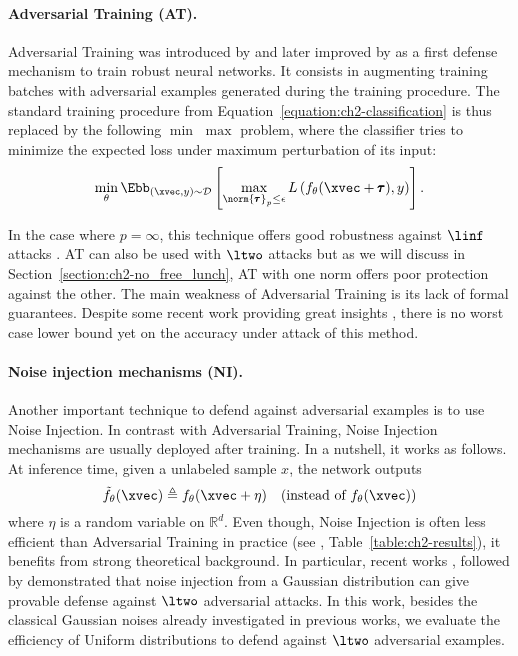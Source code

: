 \paragraph{Adversarial Training (AT).}
Adversarial Training was introduced by \citep{goodfellow2014explaining} and later improved by \citep{madry2018towards} as a first defense mechanism to train robust neural networks.
It consists in augmenting training batches with adversarial examples generated during the training procedure.
The standard training procedure from Equation~\ref{equation:ch2-classification} is thus replaced by the following  $\min$ $\max$ problem, where the classifier tries to minimize the expected loss under maximum perturbation of its input:
\begin{equation}
  \min_{\theta} \Ebb_{(\xvec, y) \sim \mathcal{D}} \left[ \max_{\norm{\pmb{\tau}}_p \leq \epsilon} L \left( f_{\theta}(\xvec + \pmb{\tau}), y \right) \right].
\end{equation}

In the case where $p=\infty$, this technique offers good robustness  against $\linf$ attacks \cite{athalye2018obfuscated}. AT can also be used with $\ltwo$ attacks but as we will discuss in Section~\ref{section:ch2-no_free_lunch}, AT with one norm offers poor protection against the other.
The main weakness of Adversarial Training is its lack of formal guarantees.
Despite some recent work providing great insights \cite{sinha2017certifying,zhang2019theoretically}, there is no worst case lower bound yet on the accuracy under attack of this method.


\paragraph{Noise injection mechanisms (NI).}
\label{subsection:ch2-randomized_training}

Another important technique to defend against adversarial examples is to use Noise Injection. 
In contrast with Adversarial Training, Noise Injection mechanisms are usually deployed after training.
In a nutshell, it works as follows.
At inference time, given a unlabeled sample $x$, the network outputs
\begin{equation}
  \tilde{f}_\theta(\xvec) \triangleq f_\theta(\xvec + \eta) \ \ \ (\text{instead of  } f_\theta(\xvec)) 
\end{equation}
where $\eta$ is a random variable on $\mathbb{R}^d$.
Even though, Noise Injection is often less efficient than Adversarial Training in practice (see \eg, Table~\ref{table:ch2-results}), it benefits from strong theoretical background.
In particular, recent works \cite{lecuyer2018certified,li2019certified}, followed by \cite{cohen2019certified,pinot2019theoretical} demonstrated that noise injection from a Gaussian distribution can give provable defense against $\ltwo$ adversarial attacks.
In this work, besides the classical Gaussian noises already investigated in previous works, we evaluate the efficiency of Uniform distributions to defend against $\ltwo$ adversarial examples. 


